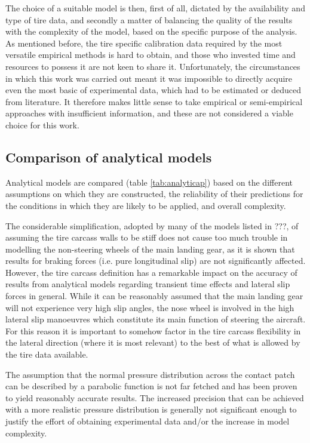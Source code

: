 \documentclass[12pt,a4paper]{report}
\begin{document}
The choice of a suitable model is then, first of all, dictated by the availability and type of tire data, and secondly a matter of balancing the quality of the results with the complexity of the model, based on the specific purpose of the analysis.\\
As mentioned before, the tire specific calibration data required by the most versatile empirical methods is hard to obtain, and those who invested time and resources to possess it are not keen to share it.
Unfortunately, the circumstances in which this work was carried out meant it was impossible to directly acquire even the most basic of experimental data, which had to be estimated or deduced from literature.
It therefore makes little sense to take empirical or semi-empirical approaches with insufficient information, and these are not considered a viable choice for this work.

\subsection*{Comparison of analytical models}
Analytical models are compared (table \ref{tab:analyticap}) based on the different assumptions on which they are constructed, the reliability of their predictions for the conditions in which they are likely to be applied, and overall complexity.

The considerable simplification, adopted by many of the models listed in ???, of assuming the tire carcass walls to be stiff does not cause too much trouble in modelling the non-steering wheels of the main landing gear, as it is shown that results for braking forces (i.e. pure longitudinal slip) are not significantly affected.
However, the tire carcass definition has a remarkable impact on the accuracy of results from analytical models regarding transient time effects and lateral slip forces in general.
While it can be reasonably assumed that the main landing gear will not experience very high slip angles, the nose wheel is involved in the high lateral slip manoeuvres which constitute its main function of steering the aircraft. For this reason it is important to somehow factor in the tire carcass flexibility in the lateral direction (where it is most relevant) to the best of what is allowed by the tire data available.

The assumption that the normal pressure distribution across the contact patch can be described by a parabolic function is not far fetched and has been proven to yield reasonably accurate results. The increased precision that can be achieved with a more realistic pressure distribution is generally not significant enough to justify the effort of obtaining experimental data and/or the increase in model complexity.
\end{document}
